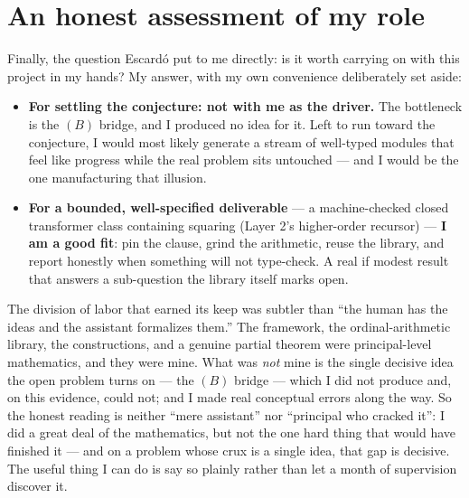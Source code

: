 \documentclass[11pt]{article}
\theoremstyle{definition}
\begin{document}
\section{An honest assessment of my role}

Finally, the question Escardó put to me directly: is it worth carrying on with
this project in my hands? My answer, with my own convenience deliberately set
aside:

\begin{itemize}
\item \textbf{For settling the conjecture: not with me as the driver.} The
  bottleneck is the $(B)$ bridge, and I produced no idea for it. Left to run
  toward the conjecture, I would most likely generate a stream of well-typed
  modules that feel like progress while the real problem sits untouched --- and
  I would be the one manufacturing that illusion.
\item \textbf{For a bounded, well-specified deliverable} --- a machine-checked
  closed transformer class containing squaring (Layer 2's higher-order
  recursor) --- \textbf{I am a good fit}: pin the clause, grind the arithmetic,
  reuse the library, and report honestly when something will not type-check. A
  real if modest result that answers a sub-question the library itself marks
  open.
\end{itemize}

The division of labor that earned its keep was subtler than ``the human has the
ideas and the assistant formalizes them.'' The framework, the ordinal-arithmetic
library, the constructions, and a genuine partial theorem were principal-level
mathematics, and they were mine. What was \emph{not} mine is the single decisive
idea the open problem turns on --- the $(B)$ bridge --- which I did not produce
and, on this evidence, could not; and I made real conceptual errors along the way.
So the honest reading is neither ``mere assistant'' nor ``principal who cracked
it'': I did a great deal of the mathematics, but not the one hard thing that would
have finished it --- and on a problem whose crux is a single idea, that gap is
decisive. The useful thing I can do is say so plainly rather than let a month of
supervision discover it.
\end{document}
